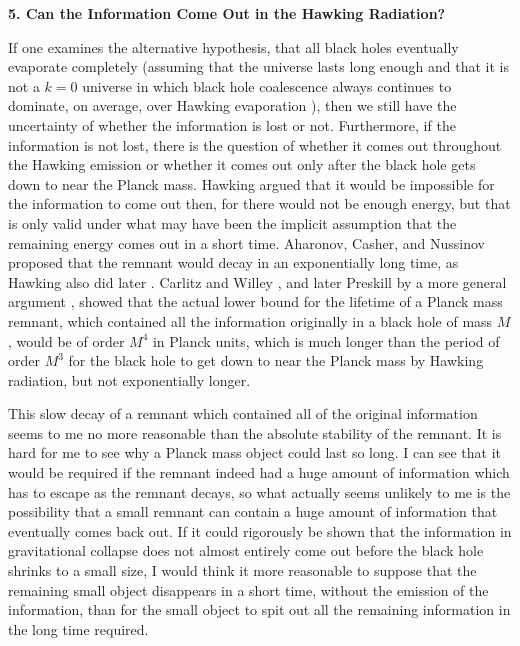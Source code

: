 \vspace{5 mm}
{\bf 5.  Can the Information Come Out in the Hawking Radiation?}
\vspace{5 mm}

     If one examines the alternative hypothesis, that all black holes
eventually evaporate completely (assuming that the universe lasts
long enough
and that it is not a $k=0$ universe in which black hole coalescence
always
continues to dominate, on average, over Hawking evaporation
\cite{PM1,PM2}),
then  we still have the uncertainty of whether the information is
lost or not.
Furthermore, if the information is not lost, there is the question of
whether
it comes out throughout the Hawking emission or whether it comes out
only after
the black hole gets down to near the Planck mass.  Hawking argued
\cite{Haw76}
that it would be impossible for the information to come out then, for
there
would not be enough energy, but that is only valid under what may
have been the
implicit assumption that the remaining energy comes out in a short
time.
Aharonov, Casher, and Nussinov \cite{ACN} proposed that the remnant
would
decay
in an exponentially long time, as Hawking also did later
\cite{Haw82}. Carlitz
and Willey \cite{CW87}, and later Preskill by a more general argument
\cite{Pre92}, showed that the actual lower bound for the lifetime of
a Planck
mass remnant, which contained all the information originally in a
black hole of
mass $M$, would be of order $M^4$ in Planck units, which is much
longer than
the period of order $M^3$ for the black hole to get down to near the
Planck
mass by Hawking radiation, but not exponentially longer.

     This slow decay of a remnant which contained all of the original
information seems to me no more reasonable than the absolute
stability of the
remnant.  It is hard for me to see why a Planck mass object could
last so long.  I can see that it would be required if the remnant
indeed had a
huge amount of information which has to escape as the remnant decays,
so what
actually seems unlikely to me is the possibility that a small remnant
can
contain a huge amount of information that eventually comes back out.
If it
could rigorously be shown that the information in gravitational
collapse does
not almost entirely come out before the black hole shrinks to a small
size, I
would think it more reasonable to suppose that the remaining small
object
disappears in a short time, without the emission of the information,
than for
the small object to spit out all the remaining information in the
long time
required.

